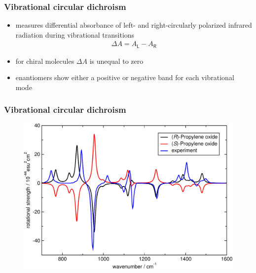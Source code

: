\documentclass[t]{beamer}
\begin{document}
	\begin{frame}
	    \frametitle{Vibrational circular dichroism}
	    \begin{itemize}
	        \item measures differential absorbance of left- and right-circularly polarized infrared radiation during vibrational transitions
	        \begin{align*}
	            \Delta A = A_\mathsf{L} - A_\mathsf{R}
	        \end{align*}
	        \item for chiral molecules $\Delta A$ is unequal to zero
	        \item enantiomers show either a positive or negative band for each vibrational mode
	    \end{itemize}
	\end{frame}
	\begin{frame}
	    \frametitle{Vibrational circular dichroism}
        \begin{figure}
            \includegraphics[width=.8\textwidth]{figures/PropOx_vcd.pdf}
        \end{figure}
	\end{frame}
\end{document}
